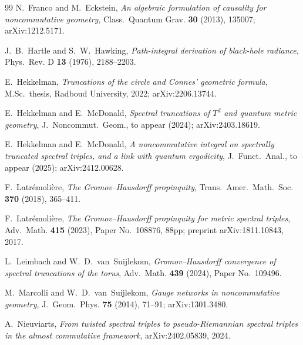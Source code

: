 \documentclass[11pt,a4paper]{article}
\theoremstyle{plain}
\theoremstyle{definition}
\begin{document}
\begin{thebibliography}{99}
N.~Franco and M.~Eckstein,
\newblock \emph{An algebraic formulation of causality for
noncommutative geometry},
\newblock Class.~Quantum Grav. \textbf{30} (2013), 135007;
\newblock arXiv:1212.5171.

J.~B.~Hartle and S.~W.~Hawking,
\newblock \emph{Path-integral derivation of black-hole radiance},
\newblock Phys.~Rev. D \textbf{13} (1976), 2188--2203.

E.~Hekkelman,
\newblock \emph{Truncations of the circle and Connes' geometric
formula},
\newblock M.Sc.\ thesis, Radboud University, 2022;
\newblock arXiv:2206.13744.

E.~Hekkelman and E.~McDonald,
\newblock \emph{Spectral truncations of $T^d$ and quantum metric
geometry},
\newblock J.~Noncommut.~Geom., to appear (2024);
\newblock arXiv:2403.18619.

E.~Hekkelman and E.~McDonald,
\newblock \emph{A noncommutative integral on spectrally truncated
spectral triples, and a link with quantum ergodicity},
\newblock J.~Funct.~Anal., to appear (2025);
\newblock arXiv:2412.00628.

F.~Latr\'emoli\`ere,
\newblock \emph{The Gromov--Hausdorff propinquity},
\newblock Trans.~Amer.~Math.~Soc. \textbf{370} (2018), 365--411.

F.~Latr\'emoli\`ere,
\newblock \emph{The Gromov--Hausdorff propinquity for metric spectral
triples},
\newblock Adv.~Math. \textbf{415} (2023), Paper No.~108876, 88pp;
\newblock preprint arXiv:1811.10843, 2017.

L.~Leimbach and W.~D.~van~Suijlekom,
\newblock \emph{Gromov--Hausdorff convergence of spectral truncations
of the torus},
\newblock Adv.~Math. \textbf{439} (2024), Paper No.~109496.

M.~Marcolli and W.~D.~van~Suijlekom,
\newblock \emph{Gauge networks in noncommutative geometry},
\newblock J.~Geom.~Phys. \textbf{75} (2014), 71--91;
\newblock arXiv:1301.3480.

A.~Nieuviarts,
\newblock \emph{From twisted spectral triples to pseudo-Riemannian
spectral triples in the almost commutative framework},
\newblock arXiv:2402.05839, 2024.


\end{thebibliography}
\end{document}
